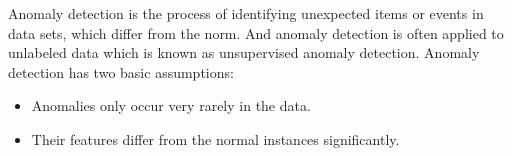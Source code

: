 Anomaly detection is the process of identifying unexpected items or events in data sets, which differ from the norm. And anomaly detection is often applied to unlabeled data which is known as unsupervised anomaly detection. Anomaly detection has two basic assumptions:

\begin{itemize}
    \item Anomalies only occur very rarely in the data.
    \item Their features differ from the normal instances significantly.
\end{itemize}
    
% 